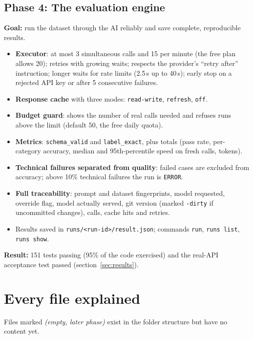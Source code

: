 \documentclass[11pt,a4paper]{article}
\newcommand{\code}[1]{\nolinkurl{#1}}
\newcommand{\empt}{\textit{(empty, later phase)}}
\begin{document}
\subsection{Phase 4: The evaluation engine}
\textbf{Goal:} run the dataset through the AI reliably and save complete, reproducible results.
\begin{itemize}
  \item \textbf{Executor}: at most 3 simultaneous calls and 15 per minute (the free plan
        allows 20); retries with growing waits; respects the provider's ``retry after''
        instruction; longer waits for rate limits (2.5\,s up to 40\,s); early stop on a
        rejected API key or after 5 consecutive failures.
  \item \textbf{Response cache} with three modes: \code{read-write}, \code{refresh}, \code{off}.
  \item \textbf{Budget guard}: shows the number of real calls needed and refuses runs above
        the limit (default 50, the free daily quota).
  \item \textbf{Metrics}: \code{schema_valid} and \code{label_exact}, plus totals (pass rate,
        per-category accuracy, median and 95th-percentile speed on fresh calls, tokens).
  \item \textbf{Technical failures separated from quality}: failed cases are excluded from
        accuracy; above 10\% technical failures the run is \code{ERROR}.
  \item \textbf{Full traceability}: prompt and dataset fingerprints, model requested, override
        flag, model actually served, git version (marked \code{-dirty} if uncommitted
        changes), calls, cache hits and retries.
  \item Results saved in \code{runs/<run-id>/result.json}; commands \code{run},
        \texttt{runs list}, \texttt{runs show}.
\end{itemize}
\textbf{Result:} 151 tests passing (95\% of the code exercised) and the real-API acceptance
test passed (section~\ref{sec:results}).

\section{Every file explained}

Files marked \empt{} exist in the folder structure but have no content yet.
\end{document}
